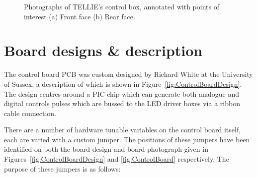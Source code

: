 \documentclass[12pt]{report}
\begin{document}
\begin{figure}
	\centering
	\newline
	\caption{Photographs of TELLIE's control box, annotated with points of interest (a) Front face (b) Rear face.}
	\label{fig:ControlBoxAnnotations} 
\end{figure}


\section{Board designs \& description}
\label{subsec:controlBoardDesign}
The control board PCB was custom designed by Richard White at the University of Sussex, a description of which is shown in Figure~\ref{fig:ControlBoardDesign}. The design centres around a PIC chip which can generate both analogue and digital controls pulses which are bussed to the LED driver boxes via a ribbon cable connection. 

There are a number of hardware tunable variables on the control board itself, each are varied with a custom jumper. The positions of these jumpers have been identified on both the board design and board photograph given in Figures~\ref{fig:ControlBoardDesign} and \ref{fig:ControlBoard} respectively. The purpose of these jumpers is as follows:
\end{document}
